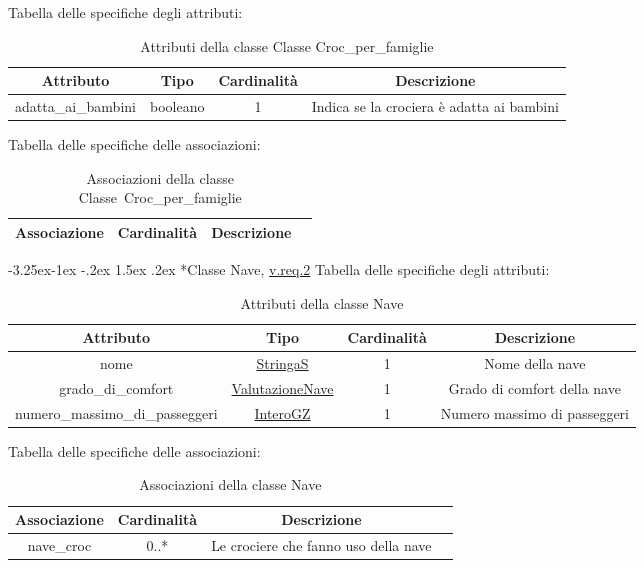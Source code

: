 \documentclass{article}
\makeatletter
\renewcommand\subsection{\@startsection{subsection}{2}{\z@}%
                                     {-3.25ex\@plus -1ex \@minus -.2ex}%
                                     {1.5ex \@plus .2ex}%
                                     {\normalfont\normalsize\bfseries}}
\makeatother
\begin{document}
Tabella delle specifiche degli attributi:
\begin{table}[h!]
    \centering
    \begin{tabular}{|c|c|c|c|}
        \hline
        Attributo & Tipo & Cardinalità & Descrizione \\
        \hline
        adatta\_ai\_bambini & booleano & 1 & Indica se la crociera è adatta ai bambini \\
        \hline
    \end{tabular}
    \caption{Attributi della classe Classe Croc\_per\_famiglie}
\end{table}

Tabella delle specifiche delle associazioni:
\begin{table}[h!]
    \centering
    \begin{tabular}{|c|c|c|c|}
        \hline
        Associazione & Cardinalità & Descrizione \\
        \hline
    \end{tabular}
    \caption{Associazioni della classe Classe\ Croc\_per\_famiglie}
\end{table}

\subsection*{Classe Nave, \hyperref[sec:RequisitiNave]{v.req.2}}\label{sec:Nave}
Tabella delle specifiche degli attributi:
\begin{table}[h!]
    \centering
    \begin{tabular}{|c|c|c|c|}
        \hline
        Attributo & Tipo & Cardinalità & Descrizione \\
        \hline
        nome & \hyperref[sec:StringaS]{StringaS} & 1 & Nome della nave \\
        grado\_di\_comfort & \hyperref[sec:ValutazioneNave]{ValutazioneNave} & 1 & Grado di comfort della nave \\
        numero\_massimo\_di\_passeggeri & \hyperref[sec:InteroGZ]{InteroGZ} & 1 & Numero massimo di passeggeri \\
        \hline
    \end{tabular}
    \caption{Attributi della classe Nave}
\end{table}

Tabella delle specifiche delle associazioni:
\begin{table}[h!]
    \centering
    \begin{tabular}{|c|c|c|c|}
        \hline
        Associazione & Cardinalità & Descrizione \\
        \hline
        nave\_croc & 0..* & Le crociere che fanno uso della nave \\
        \hline
    \end{tabular}
    \caption{Associazioni della classe Nave}
\end{table}
\end{document}
